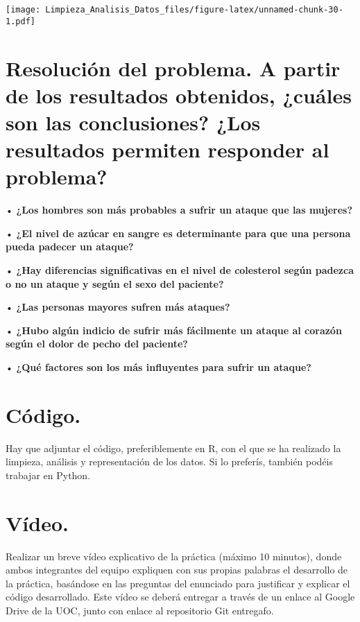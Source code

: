 \documentclass[
]{article}
\begin{document}
\texttt{[image: Limpieza\_Analisis\_Datos\_files/figure-latex/unnamed-chunk-30-1.pdf]}

\hypertarget{resoluciuxf3n-del-problema.-a-partir-de-los-resultados-obtenidos-cuuxe1les-son-las-conclusiones-los-resultados-permiten-responder-al-problema}{%
\section{Resolución del problema. A partir de los resultados obtenidos,
¿cuáles son las conclusiones? ¿Los resultados permiten responder al
problema?}\label{resoluciuxf3n-del-problema.-a-partir-de-los-resultados-obtenidos-cuuxe1les-son-las-conclusiones-los-resultados-permiten-responder-al-problema}}

• \textbf{¿Los hombres son más probables a sufrir un ataque que las
mujeres?}

• \textbf{¿El nivel de azúcar en sangre es determinante para que una
persona pueda padecer un ataque?}

• \textbf{¿Hay diferencias significativas en el nivel de colesterol
según padezca o no un ataque y según el sexo del paciente?}

• \textbf{¿Las personas mayores sufren más ataques?}

• \textbf{¿Hubo algún indicio de sufrir más fácilmente un ataque al
corazón según el dolor de pecho del paciente?}

• \textbf{¿Qué factores son los más influyentes para sufrir un ataque?}

\hypertarget{cuxf3digo.}{%
\section{Código.}\label{cuxf3digo.}}

Hay que adjuntar el código, preferiblemente en R, con el que se ha
realizado la limpieza, análisis y representación de los datos. Si lo
preferís, también podéis trabajar en Python.

\hypertarget{vuxeddeo.}{%
\section{Vídeo.}\label{vuxeddeo.}}

Realizar un breve vídeo explicativo de la práctica (máximo 10 minutos),
donde ambos integrantes del equipo expliquen con sus propias palabras el
desarrollo de la práctica, basándose en las preguntas del enunciado para
justificar y explicar el código desarrollado. Este vídeo se deberá
entregar a través de un enlace al Google Drive de la UOC, junto con
enlace al repositorio Git entregafo.
\end{document}
